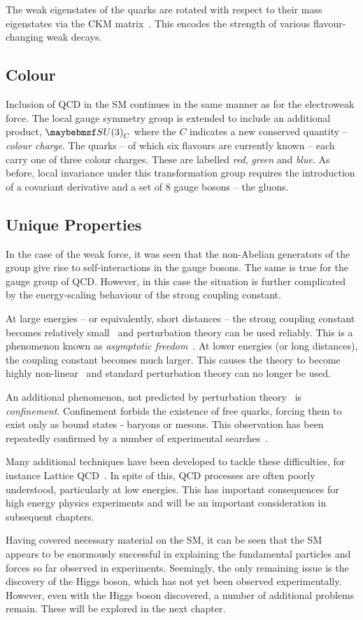 The weak eigenstates of the quarks are rotated with respect to their mass
eigenstates via the \acl{CKM} matrix~\cite{cabibbo,kobayashi_maskawa}. This
encodes the strength of various flavour-changing weak decays.

\subsection{Colour}
Inclusion of \ac{QCD} in the \ac{SM} continues in the same manner as for the
electroweak force. The local gauge symmetry group is extended to include an
additional product, $\SUthree_{C}$ where the $C$ indicates a new conserved
quantity -- \emph{colour charge}. The quarks -- of which six flavours are
currently known -- each carry one of three colour charges. These are labelled
\emph{red}, \emph{green} and \emph{blue}. As before, local invariance under this
transformation group requires the introduction of a covariant derivative and a
set of 8 gauge bosons -- the gluons.

\subsection{Unique Properties}
In the case of the weak force, it was seen that the non-Abelian generators of
the \SUtwo group give rise to self-interactions in the gauge bosons. The same is
true for the \SUthree gauge group of \ac{QCD}. However, in this case the
situation is further complicated by the energy-scaling behaviour of the strong
coupling constant.

At large energies -- or equivalently, short distances -- the strong coupling
constant becomes relatively small~\cite{lattice_qcd} and perturbation theory can
be used reliably. This is a phenomenon known as \emph{asymptotic
  freedom}~\cite{asymptotic_freedom}. At lower energies (or long distances), the
coupling constant becomes much larger. This causes the theory to become highly
non-linear~\cite{lattice_qcd2} and standard perturbation theory can no longer be
used.

An additional phenomenon, not predicted by perturbation
theory~\cite{perturbative_qcd_handbook} is \emph{confinement}. Confinement
forbids the existence of free quarks, forcing them to exist only as bound states
- baryons or mesons. This observation has been repeatedly confirmed by a number
of experimental searches~\cite[p.~30]{pdg}.

Many additional techniques have been developed to tackle these difficulties, for
instance Lattice \ac{QCD}~\cite{lattice_qcd}. In spite of this, \ac{QCD}
processes are often poorly understood, particularly at low energies. This has
important consequences for high energy physics experiments and will be an
important consideration in subsequent chapters.

Having covered necessary material on the \ac{SM}, it can be seen that the
\ac{SM} appears to be enormously successful in explaining the fundamental
particles and forces so far observed in experiments. Seemingly, the only
remaining issue is the discovery of the Higgs boson, which has not yet been
observed experimentally. However, even with the Higgs boson discovered, a number
of additional problems remain. These will be explored in the next chapter.
